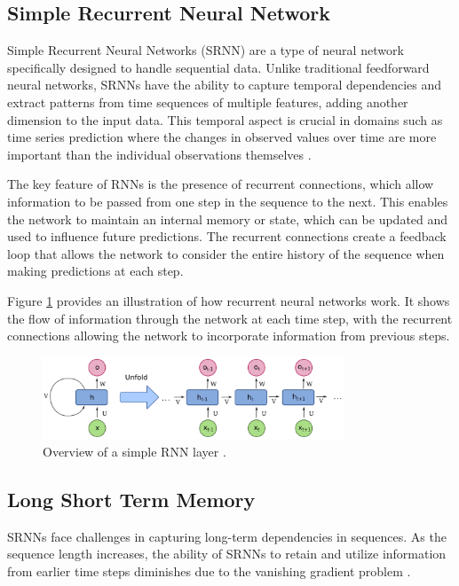 \subsection{Simple Recurrent Neural Network}

Simple Recurrent Neural Networks (SRNN) \cite{new8} are a type of neural network specifically designed to handle sequential data. Unlike traditional feedforward neural networks, SRNNs have the ability to capture temporal dependencies and extract patterns from time sequences of multiple features, adding another dimension to the input data. This temporal aspect is crucial in domains such as time series prediction where the changes in observed values over time are more important than the individual observations themselves \cite{new7}.

The key feature of RNNs is the presence of recurrent connections, which allow information to be passed from one step in the sequence to the next. This enables the network to maintain an internal memory or state, which can be updated and used to influence future predictions. The recurrent connections create a feedback loop that allows the network to consider the entire history of the sequence when making predictions at each step.

Figure \ref{fig:overview-rnn} provides an illustration of how recurrent neural networks work. It shows the flow of information through the network at each time step, with the recurrent connections allowing the network to incorporate information from previous steps.

\begin{figure}[h]
	\centering
	\includegraphics[width=0.8\textwidth, keepaspectratio]{figures/overview-rnn}
	\caption{Overview of a simple RNN layer \cite{fig-srnn}.}
	\label{fig:overview-rnn}
\end{figure}

\subsection{Long Short Term Memory}

SRNNs face challenges in capturing long-term dependencies in sequences. As the sequence length increases, the ability of SRNNs to retain and utilize information from earlier time steps diminishes due to the vanishing gradient problem \cite{rnn-vanishing-gradient}.

